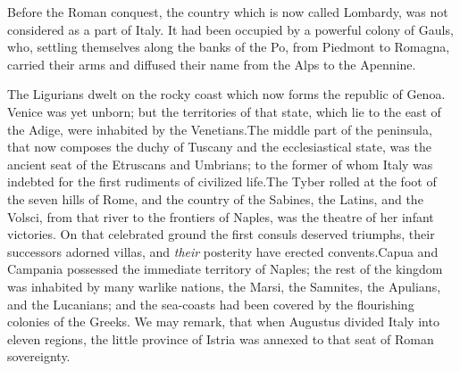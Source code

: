 Before the Roman conquest, the country which is now called
Lombardy, was not considered as a part of Italy. It had been
occupied by a powerful colony of Gauls, who, settling themselves
along the banks of the Po, from Piedmont to Romagna, carried
their arms and diffused their name from the Alps to the Apennine.

The Ligurians dwelt on the rocky coast which now forms the
republic of Genoa. Venice was yet unborn; but the territories of
that state, which lie to the east of the Adige, were inhabited by
the Venetians.\footnotemark[74] The middle part of the peninsula, that now
composes the duchy of Tuscany and the ecclesiastical state, was
the ancient seat of the Etruscans and Umbrians; to the former of
whom Italy was indebted for the first rudiments of civilized
life.\footnotemark[75] The Tyber rolled at the foot of the seven hills of Rome,
and the country of the Sabines, the Latins, and the Volsci, from
that river to the frontiers of Naples, was the theatre of her
infant victories. On that celebrated ground the first consuls
deserved triumphs, their successors adorned villas, and \textit{their}
posterity have erected convents.\footnotemark[76] Capua and Campania possessed
the immediate territory of Naples; the rest of the kingdom was
inhabited by many warlike nations, the Marsi, the Samnites, the
Apulians, and the Lucanians; and the sea-coasts had been covered
by the flourishing colonies of the Greeks. We may remark, that
when Augustus divided Italy into eleven regions, the little
province of Istria was annexed to that seat of Roman sovereignty.\footnotemark[77]






